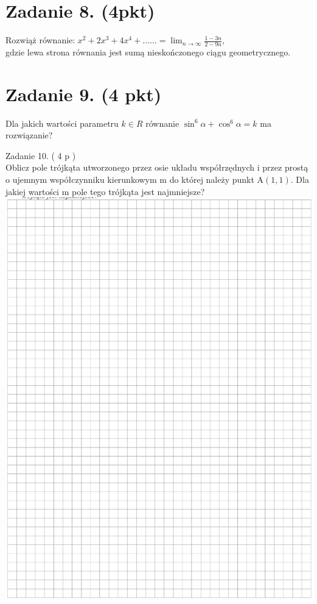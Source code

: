 \documentclass[10pt]{article}
\begin{document}
\section*{Zadanie 8. (4pkt)}
Rozwiąż równanie: \(x^{2}+2 x^{3}+4 x^{4}+\ldots \ldots=\lim _{n \rightarrow \infty} \frac{1-3 n}{2-9 n}\),\\
gdzie lewa strona równania jest sumą nieskończonego ciągu geometrycznego.

\section*{Zadanie 9. (4 pkt)}
Dla jakich wartości parametru \(k \in R\) równanie \(\sin ^{6} \alpha+\cos ^{6} \alpha=k\) ma rozwiązanie?

Zadanie 10. ( 4 p )\\
Oblicz pole trójkąta utworzonego przez osie układu współrzędnych i przez prostą o ujemnym współczynniku kierunkowym m do której należy punkt \(\mathrm{A}(1,1)\). Dla jakiej wartości m pole tego trójkąta jest najmniejsze?\\
\includegraphics[max width=\textwidth, center]{2024_11_21_12a27a32a51fef2c834ag-07}
\end{document}
